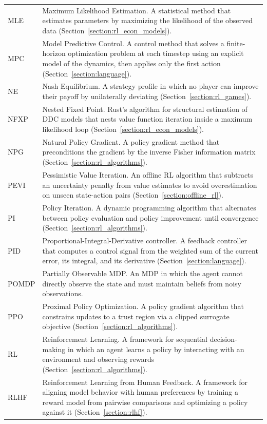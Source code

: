 \begin{longtable}{p{2.2cm} p{12cm}}
MLE & Maximum Likelihood Estimation. A statistical method that estimates parameters by maximizing the likelihood of the observed data (Section~\ref*{section:rl_econ_models}). \\[4pt]
MPC & Model Predictive Control. A control method that solves a finite-horizon optimization problem at each timestep using an explicit model of the dynamics, then applies only the first action (Section~\ref*{section:language}). \\[4pt]
NE & Nash Equilibrium. A strategy profile in which no player can improve their payoff by unilaterally deviating (Section~\ref*{section:rl_games}). \\[4pt]
NFXP & Nested Fixed Point. Rust's algorithm for structural estimation of DDC models that nests value function iteration inside a maximum likelihood loop (Section~\ref*{section:rl_econ_models}). \\[4pt]
NPG & Natural Policy Gradient. A policy gradient method that preconditions the gradient by the inverse Fisher information matrix (Section~\ref*{section:rl_algorithms}). \\[4pt]
PEVI & Pessimistic Value Iteration. An offline RL algorithm that subtracts an uncertainty penalty from value estimates to avoid overestimation on unseen state-action pairs (Section~\ref*{section:offline_rl}). \\[4pt]
PI & Policy Iteration. A dynamic programming algorithm that alternates between policy evaluation and policy improvement until convergence (Section~\ref*{section:rl_algorithms}). \\[4pt]
PID & Proportional-Integral-Derivative controller. A feedback controller that computes a control signal from the weighted sum of the current error, its integral, and its derivative (Section~\ref*{section:language}). \\[4pt]
POMDP & Partially Observable MDP. An MDP in which the agent cannot directly observe the state and must maintain beliefs from noisy observations. \\[4pt]
PPO & Proximal Policy Optimization. A policy gradient algorithm that constrains updates to a trust region via a clipped surrogate objective (Section~\ref*{section:rl_algorithms}). \\[4pt]
RL & Reinforcement Learning. A framework for sequential decision-making in which an agent learns a policy by interacting with an environment and observing rewards (Section~\ref*{section:rl_algorithms}). \\[4pt]
RLHF & Reinforcement Learning from Human Feedback. A framework for aligning model behavior with human preferences by training a reward model from pairwise comparisons and optimizing a policy against it (Section~\ref*{section:rlhf}). \\[4pt]

\end{longtable}
